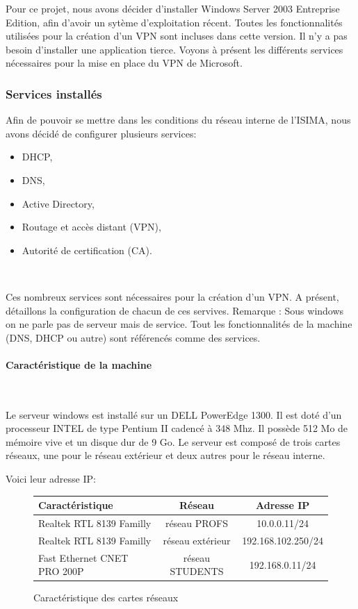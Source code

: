 	Pour ce projet, nous avons décider d'installer Windows Server 2003 Entreprise Edition, afin d'avoir un sytème d'exploitation récent. Toutes les fonctionnalités utilisées pour la création d'un VPN sont incluses dans cette version. Il n'y a pas besoin d'installer une application tierce.
	Voyons à présent les différents services nécessaires pour la mise en place du VPN de Microsoft.

\subsubsection{Services installés}

	Afin de pouvoir se mettre dans les conditions du réseau interne de l'ISIMA, nous avons décidé de configurer plusieurs services:
~


\begin{itemize}
	\item  DHCP,
	\item  DNS, 
	\item  Active Directory,
	\item  Routage et accès distant (VPN),
	\item  Autorité de certification (CA).
\end{itemize}
~	

	Ces nombreux services sont nécessaires pour la création d'un VPN. A présent, détaillons la configuration de chacun de ces servives. 
	Remarque : Sous windows on ne parle pas de serveur mais de service. Tout les fonctionnalités de la machine (DNS, DHCP ou autre) sont référencés comme des services.


\paragraph{Caractéristique de la machine}
~\

Le serveur windows est installé sur un DELL PowerEdge 1300. Il est doté d'un processeur INTEL de type Pentium II cadencé à 348 Mhz. Il possède 512 Mo de mémoire vive et un disque dur de 9 Go.
Le serveur est composé de trois cartes réseaux, une pour le réseau extérieur et deux autres pour le réseau interne. 



Voici leur adresse IP:

\begin{figure}[H]
	\begin{center}
\begin{tabular}{|l|c|c|}
\hline
Caractéristique & Réseau & Adresse IP \\
\hline
Realtek RTL 8139 Familly & réseau PROFS & 10.0.0.11/24 \\
Realtek RTL 8139 Familly & réseau extérieur & 192.168.102.250/24 \\
Fast Ethernet CNET PRO 200P & réseau STUDENTS & 192.168.0.11/24 \\
\hline
\end{tabular}
	\end{center}
	\caption{Caractéristique des cartes réseaux}
	\label{IP_carte_reseau}
\end{figure}

